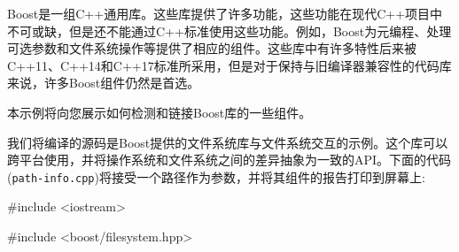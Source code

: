 Boost是一组C++通用库。这些库提供了许多功能，这些功能在现代C++项目中不可或缺，但是还不能通过C++标准使用这些功能。例如，Boost为元编程、处理可选参数和文件系统操作等提供了相应的组件。这些库中有许多特性后来被C++11、C++14和C++17标准所采用，但是对于保持与旧编译器兼容性的代码库来说，许多Boost组件仍然是首选。

本示例将向您展示如何检测和链接Boost库的一些组件。


我们将编译的源码是Boost提供的文件系统库与文件系统交互的示例。这个库可以跨平台使用，并将操作系统和文件系统之间的差异抽象为一致的API。下面的代码(\texttt{path-info.cpp})将接受一个路径作为参数，并将其组件的报告打印到屏幕上:

\begin{codebox}[cpp]
#include <iostream>

#include <boost/filesystem.hpp>


\end{codebox}
